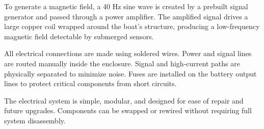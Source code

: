 To generate a magnetic field, a 40 Hz sine wave is created by a prebuilt signal generator and passed through a power amplifier. The amplified signal drives a large copper coil wrapped around the boat's structure, producing a low-frequency magnetic field detectable by submerged sensors.

All electrical connections are made using soldered wires. Power and signal lines are routed manually inside the enclosure. Signal and high-current paths are physically separated to minimize noise. Fuses are installed on the battery output lines to protect critical components from short circuits.

The electrical system is simple, modular, and designed for ease of repair and future upgrades. Components can be swapped or rewired without requiring full system disassembly.